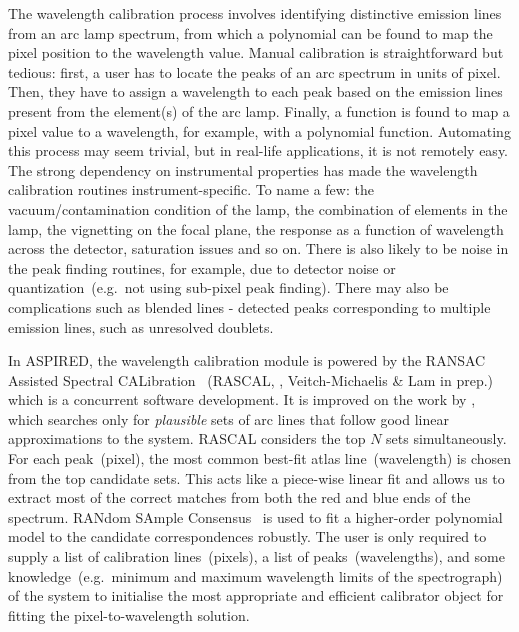 \documentclass[linenumbers, twocolumn]{aastex631}
\begin{document}
The wavelength calibration process involves identifying distinctive emission
lines from an arc lamp spectrum, from which a polynomial can be found to map the
pixel position to the wavelength value. Manual calibration is straightforward
but tedious: first, a user has to locate the peaks of an arc spectrum in units of
pixel. Then, they have to assign a wavelength to each peak based on the emission
lines present from the element(s) of the arc lamp. Finally, a function is found
to map a pixel value to a wavelength, for example, with a polynomial function.
Automating this process may seem trivial, but in real-life applications, it is not 
remotely easy. The strong dependency on instrumental properties has made the
wavelength calibration routines instrument-specific. To name a few: the vacuum/contamination condition of the lamp, the combination of elements in the
lamp, the vignetting on the focal plane, the response as a function of wavelength
across the detector, saturation issues and so on. There is also likely to be
noise in the peak finding routines, for example, due to detector noise or
quantization~(e.g.\ not using sub-pixel peak finding). There may also be
complications such as blended lines - detected peaks corresponding to multiple
emission lines, such as unresolved doublets.

In \textsc{ASPIRED}, the wavelength calibration module is powered by the RANSAC
Assisted Spectral CALibration ~(\textsc{RASCAL}, \citealt{2020zndo...4117517V,
2020ASPC..527..627V}, Veitch-Michaelis \& Lam in prep.) which is a concurrent
software development. It is improved on the work by \citet{2018ApOpt..57.6876S},
which searches only for \textit{plausible} sets of arc lines that follow good
linear approximations to the system. \textsc{RASCAL} considers the top $N$ sets
simultaneously. For each peak~(pixel), the most common best-fit atlas
line~(wavelength) is chosen from the top candidate sets. This acts like a
piece-wise linear fit and allows us to extract most of the correct matches from
both the red and blue ends of the spectrum. RANdom SAmple
Consensus~\citep[RANSAC,][]{fischler_bolles_1981} is used to fit a higher-order
polynomial model to the candidate correspondences robustly. The user is only
required to supply a list of calibration lines~(pixels), a list of
peaks~(wavelengths), and some knowledge~(e.g.\ minimum and maximum wavelength
limits of the spectrograph) of the system to initialise the most appropriate
and efficient calibrator object for fitting the pixel-to-wavelength solution.

\end{document}
